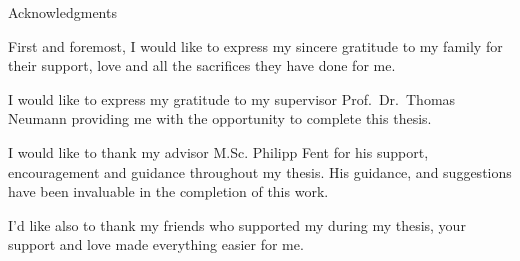 \thispagestyle{empty}

\vspace*{20mm}

\begin{center}
{ Acknowledgments}
\end{center}

\vspace{10mm}

First and foremost, I would like to express my sincere gratitude to my family for their support, love and all the sacrifices they have done for me.

I would like to express my gratitude to my supervisor Prof.\ Dr.\ Thomas Neumann providing me with the opportunity to complete this thesis.

I would like to thank my advisor M.Sc. Philipp Fent for his support, encouragement and guidance throughout my thesis. His guidance, and suggestions have been invaluable in the completion of this work.

I'd like also to thank my friends who supported my during my thesis, your support and love made everything easier for me.

\cleardoublepage{}
